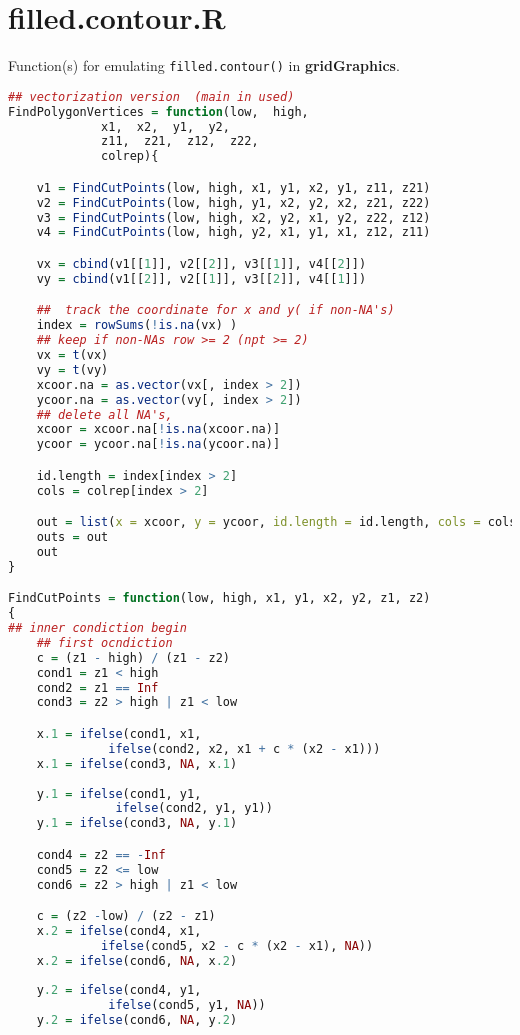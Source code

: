 \section{filled.contour.R}
Function(s) for emulating \texttt{filled.contour()} in \textbf{gridGraphics}.
\begin{lstlisting}[language = R]
## vectorization version  (main in used)
FindPolygonVertices = function(low,  high,
		     x1,  x2,  y1,  y2,
		     z11,  z21,  z12,  z22,
             colrep){

    v1 = FindCutPoints(low, high, x1, y1, x2, y1, z11, z21)
    v2 = FindCutPoints(low, high, y1, x2, y2, x2, z21, z22)
    v3 = FindCutPoints(low, high, x2, y2, x1, y2, z22, z12)
    v4 = FindCutPoints(low, high, y2, x1, y1, x1, z12, z11)

    vx = cbind(v1[[1]], v2[[2]], v3[[1]], v4[[2]])
    vy = cbind(v1[[2]], v2[[1]], v3[[2]], v4[[1]])

    ##  track the coordinate for x and y( if non-NA's)
    index = rowSums(!is.na(vx) )
    ## keep if non-NAs row >= 2 (npt >= 2)
    vx = t(vx)
    vy = t(vy)
    xcoor.na = as.vector(vx[, index > 2])
    ycoor.na = as.vector(vy[, index > 2])
    ## delete all NA's,
    xcoor = xcoor.na[!is.na(xcoor.na)]
    ycoor = ycoor.na[!is.na(ycoor.na)]

    id.length = index[index > 2]
    cols = colrep[index > 2]

    out = list(x = xcoor, y = ycoor, id.length = id.length, cols = cols)
    outs = out
    out
}

FindCutPoints = function(low, high, x1, y1, x2, y2, z1, z2)
{
## inner condiction begin
    ## first ocndiction
    c = (z1 - high) / (z1 - z2)
    cond1 = z1 < high
    cond2 = z1 == Inf
    cond3 = z2 > high | z1 < low

    x.1 = ifelse(cond1, x1, 
              ifelse(cond2, x2, x1 + c * (x2 - x1)))
    x.1 = ifelse(cond3, NA, x.1)
                
    y.1 = ifelse(cond1, y1, 
               ifelse(cond2, y1, y1))
    y.1 = ifelse(cond3, NA, y.1)

    cond4 = z2 == -Inf
    cond5 = z2 <= low
    cond6 = z2 > high | z1 < low

    c = (z2 -low) / (z2 - z1)
    x.2 = ifelse(cond4, x1,
             ifelse(cond5, x2 - c * (x2 - x1), NA))
    x.2 = ifelse(cond6, NA, x.2)
             
    y.2 = ifelse(cond4, y1,
              ifelse(cond5, y1, NA))
    y.2 = ifelse(cond6, NA, y.2)


\end{lstlisting}
